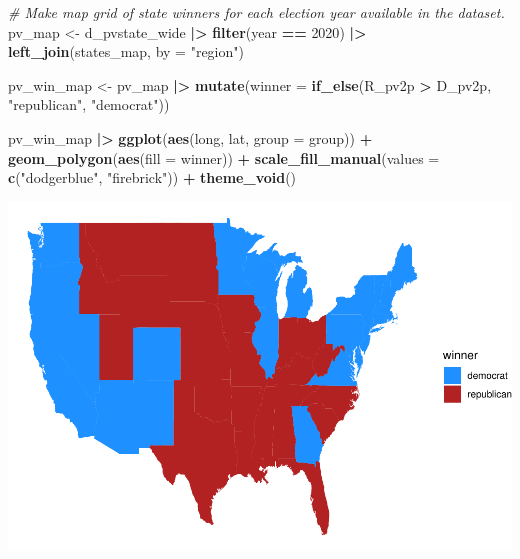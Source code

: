 \documentclass[
]{article}
\newenvironment{Shaded}{\begin{snugshade}}{\end{snugshade}}
\newcommand{\AttributeTok}[1]{\textcolor[rgb]{0.13,0.29,0.53}{#1}}
\newcommand{\CommentTok}[1]{\textcolor[rgb]{0.56,0.35,0.01}{\textit{#1}}}
\newcommand{\DecValTok}[1]{\textcolor[rgb]{0.00,0.00,0.81}{#1}}
\newcommand{\FunctionTok}[1]{\textcolor[rgb]{0.13,0.29,0.53}{\textbf{#1}}}
\newcommand{\NormalTok}[1]{#1}
\newcommand{\OtherTok}[1]{\textcolor[rgb]{0.56,0.35,0.01}{#1}}
\newcommand{\SpecialCharTok}[1]{\textcolor[rgb]{0.81,0.36,0.00}{\textbf{#1}}}
\newcommand{\StringTok}[1]{\textcolor[rgb]{0.31,0.60,0.02}{#1}}
\begin{document}
\begin{Shaded}
\begin{Highlighting}[]
\CommentTok{\# Make map grid of state winners for each election year available in the dataset.}
\NormalTok{pv\_map }\OtherTok{\textless{}{-}}\NormalTok{ d\_pvstate\_wide }\SpecialCharTok{|\textgreater{}}
  \FunctionTok{filter}\NormalTok{(year }\SpecialCharTok{==} \DecValTok{2020}\NormalTok{) }\SpecialCharTok{|\textgreater{}}
  \FunctionTok{left\_join}\NormalTok{(states\_map, }\AttributeTok{by =} \StringTok{"region"}\NormalTok{)}

\NormalTok{pv\_win\_map }\OtherTok{\textless{}{-}}\NormalTok{ pv\_map }\SpecialCharTok{|\textgreater{}}
  \FunctionTok{mutate}\NormalTok{(}\AttributeTok{winner =} \FunctionTok{if\_else}\NormalTok{(R\_pv2p }\SpecialCharTok{\textgreater{}}\NormalTok{ D\_pv2p, }\StringTok{"republican"}\NormalTok{, }\StringTok{"democrat"}\NormalTok{))}

\NormalTok{pv\_win\_map }\SpecialCharTok{|\textgreater{}}
  \FunctionTok{ggplot}\NormalTok{(}\FunctionTok{aes}\NormalTok{(long, lat, }\AttributeTok{group =}\NormalTok{ group)) }\SpecialCharTok{+}
  \FunctionTok{geom\_polygon}\NormalTok{(}\FunctionTok{aes}\NormalTok{(}\AttributeTok{fill =}\NormalTok{ winner)) }\SpecialCharTok{+}
  \FunctionTok{scale\_fill\_manual}\NormalTok{(}\AttributeTok{values =} \FunctionTok{c}\NormalTok{(}\StringTok{"dodgerblue"}\NormalTok{, }\StringTok{"firebrick"}\NormalTok{)) }\SpecialCharTok{+}
  \FunctionTok{theme\_void}\NormalTok{()}
\end{Highlighting}
\end{Shaded}

\includegraphics{Lab1-notes_files/figure-latex/unnamed-chunk-2-1.pdf}
\end{document}
